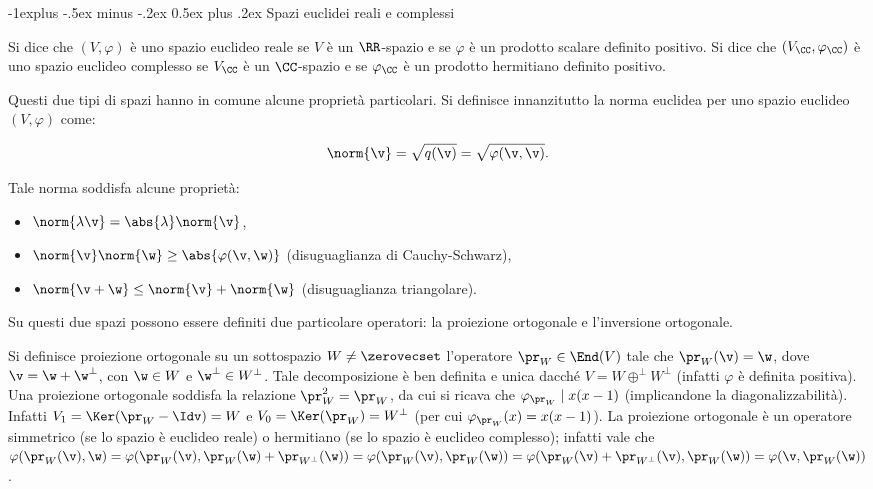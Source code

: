 \documentclass[10pt,landscape]{article}
\makeatletter
\renewcommand{\subsection}{\@startsection{subsection}{2}{0mm}%
	{-1explus -.5ex minus -.2ex}%
	{0.5ex plus .2ex}%
	{\normalfont\normalsize\bfseries}}
\makeatother
\begin{document}
\begin{multicols}{3}
		\subsection{Spazi euclidei reali e complessi}
		
		Si dice che $(V, \varphi)$ è uno spazio euclideo reale se $V$ è un $\RR$-spazio e se
		$\varphi$ è un prodotto scalare definito positivo. Si dice che $(V_\CC, \varphi_\CC)$ è uno spazio euclideo complesso se $V_\CC$ è un $\CC$-spazio e se $\varphi_\CC$ è un
		prodotto hermitiano definito positivo.
		
		Questi due tipi di spazi hanno in comune alcune proprietà particolari. Si definisce
		innanzitutto la norma euclidea per uno spazio euclideo $(V, \varphi)$ come:
		
		\[ \norm{\v} = \sqrt{q(\v)} = \sqrt{\varphi(\v, \v)}. \]
		
		Tale norma soddisfa alcune proprietà:
		
		\begin{itemize}
			\item $\norm{\lambda \v} = \abs{\lambda} \norm{\v}$,
			\item $\norm{\v} \norm{\w} \geq \abs{\varphi(\v, \w)}$ (disuguaglianza di Cauchy-Schwarz),
			\item $\norm{\v + \w} \leq \norm{\v} + \norm{\w}$ (disuguaglianza triangolare).
		\end{itemize}
		
		Su questi due spazi possono essere definiti due particolare operatori: la
		proiezione ortogonale e l'inversione ortogonale.
		
		Si definisce proiezione ortogonale su un sottospazio $W \neq \zerovecset$ l'operatore $\pr_W \in \End(V)$ tale
		che $\pr_W(\v) = \w$, dove $\v = \w + \w^\perp$, con $\w \in W$ e $\w^\perp \in W^\perp$. Tale decomposizione è ben definita e unica dacché $V = W \oplus^\perp W^\perp$ (infatti $\varphi$ è definita positiva). Una proiezione ortogonale
		soddisfa la relazione $\pr_W^2 = \pr_W$, da cui si ricava che $\varphi_{\pr_W} \mid x(x-1)$ (implicandone la diagonalizzabilità). Infatti $V_1 = \Ker(\pr_W - \Idv) = W$ e $V_0 = \Ker(\pr_W) = W^\perp$ (per cui $\varphi_{\pr_W}(x) = x(x-1)$). La
		proiezione ortogonale è un operatore simmetrico (se lo spazio è euclideo reale)
		o hermitiano (se lo spazio è euclideo complesso); infatti vale che
		$\varphi(\pr_W(\v), \w) = \varphi(\pr_W(\v), \pr_W(\w) + \pr_{W^\perp}(\w)) =
		\varphi(\pr_W(\v), \pr_W(\w)) = \varphi(\pr_W(\v) + \pr_{W^\perp}(\v), \pr_W(\w)) =
		\varphi(\v, \pr_W(\w))$.
		

\end{multicols}
\end{document}
